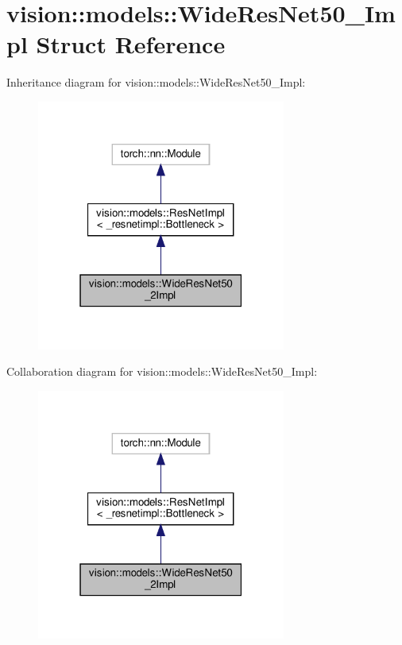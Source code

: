 \hypertarget{structvision_1_1models_1_1WideResNet50__2Impl}{}\section{vision\+:\+:models\+:\+:Wide\+Res\+Net50\+\_\+Impl Struct Reference}
\label{structvision_1_1models_1_1WideResNet50__2Impl}


Inheritance diagram for vision\+:\+:models\+:\+:Wide\+Res\+Net50\+\_\+Impl\+:
\nopagebreak
\begin{figure}[H]
\begin{center}
\leavevmode
\includegraphics[width=232pt]{structvision_1_1models_1_1WideResNet50__2Impl__inherit__graph}
\end{center}
\end{figure}


Collaboration diagram for vision\+:\+:models\+:\+:Wide\+Res\+Net50\+\_\+Impl\+:
\nopagebreak
\begin{figure}[H]
\begin{center}
\leavevmode
\includegraphics[width=232pt]{structvision_1_1models_1_1WideResNet50__2Impl__coll__graph}
\end{center}
\end{figure}
